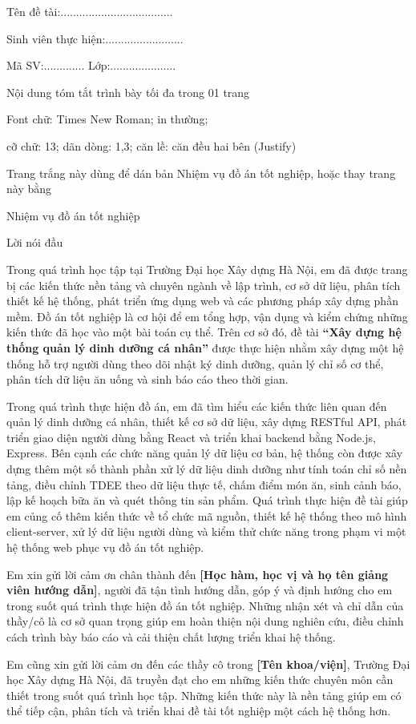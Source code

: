 Tên đề tài:....................................

Sinh viên thực hiện:.........................

Mã SV:............. Lớp:.....................

{Nội dung tóm tắt trình bày tối đa trong 01 trang} {Font chữ: Times New Roman; in thường;

cỡ chữ: 13; dãn dòng: 1,3; căn lề: căn đều hai bên (Justify)}

{Trang trắng này dùng để dán bản Nhiệm vụ đồ án tốt nghiệp, hoặc thay trang này bằng

Nhiệm vụ đồ án tốt nghiệp}

Lời nói đầu

Trong quá trình học tập tại Trường Đại học Xây dựng Hà Nội, em đã được trang bị các kiến thức nền tảng và chuyên ngành về lập trình, cơ sở dữ liệu, phân tích thiết kế hệ thống, phát triển ứng dụng web và các phương pháp xây dựng phần mềm. Đồ án tốt nghiệp là cơ hội để em tổng hợp, vận dụng và kiểm chứng những kiến thức đã học vào một bài toán cụ thể. Trên cơ sở đó, đề tài \textbf{“Xây dựng hệ thống quản lý dinh dưỡng cá nhân”} được thực hiện nhằm xây dựng một hệ thống hỗ trợ người dùng theo dõi nhật ký dinh dưỡng, quản lý chỉ số cơ thể, phân tích dữ liệu ăn uống và sinh báo cáo theo thời gian.

Trong quá trình thực hiện đồ án, em đã tìm hiểu các kiến thức liên quan đến quản lý dinh dưỡng cá nhân, thiết kế cơ sở dữ liệu, xây dựng RESTful API, phát triển giao diện người dùng bằng React và triển khai backend bằng Node.js, Express. Bên cạnh các chức năng quản lý dữ liệu cơ bản, hệ thống còn được xây dựng thêm một số thành phần xử lý dữ liệu dinh dưỡng như tính toán chỉ số nền tảng, điều chỉnh TDEE theo dữ liệu thực tế, chấm điểm món ăn, sinh cảnh báo, lập kế hoạch bữa ăn và quét thông tin sản phẩm. Quá trình thực hiện đề tài giúp em củng cố thêm kiến thức về tổ chức mã nguồn, thiết kế hệ thống theo mô hình client-server, xử lý dữ liệu người dùng và kiểm thử chức năng trong phạm vi một hệ thống web phục vụ đồ án tốt nghiệp.

Em xin gửi lời cảm ơn chân thành đến \textbf{[Học hàm, học vị và họ tên giảng viên hướng dẫn]}, người đã tận tình hướng dẫn, góp ý và định hướng cho em trong suốt quá trình thực hiện đồ án tốt nghiệp. Những nhận xét và chỉ dẫn của thầy/cô là cơ sở quan trọng giúp em hoàn thiện nội dung nghiên cứu, điều chỉnh cách trình bày báo cáo và cải thiện chất lượng triển khai hệ thống.

Em cũng xin gửi lời cảm ơn đến các thầy cô trong \textbf{[Tên khoa/viện]}, Trường Đại học Xây dựng Hà Nội, đã truyền đạt cho em những kiến thức chuyên môn cần thiết trong suốt quá trình học tập. Những kiến thức này là nền tảng giúp em có thể tiếp cận, phân tích và triển khai đề tài tốt nghiệp một cách hệ thống hơn.

